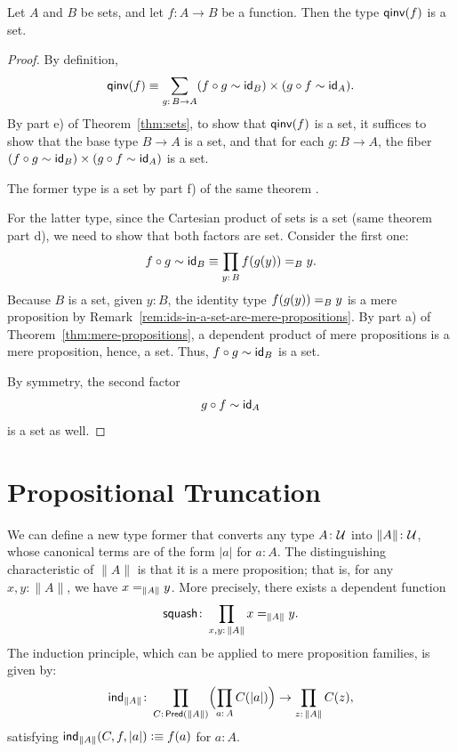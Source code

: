 \begin{prop}\fe\label{prop:qinv-is-a-set}
    Let\/ $A$ and\/ $B$ be sets, and let\/ $f\colon A\to B$ be a function. Then the type\/ $\mathsf{qinv}(f)$ is a set.
\end{prop}

\begin{proof}
    By definition,
    \[
        \fun{qinv}(f) \equiv \sum_{g\colon B\to A} (f\circ g \sim \id_B) \times (g\circ f \sim \id_A).
    \]
    By part e) of Theorem~\ref{thm:sets}, to show that $\mathsf{qinv}(f)$ is a set, it suffices to show that the base type $B\to A$ is a set, and that for each $g\colon B\to A$, the fiber $(f\circ g \sim \mathsf{id}_B) \times (g\circ f \sim \mathsf{id}_A)$ is a set.

    The former type is a set by part f) of the same theorem .
    
    For the latter type, since the Cartesian product of sets is a set (same theorem part d), we need to show that both factors are set. Consider the first one:
    \[
        f\circ g\sim\id_B
            \equiv\prod_{y\colon B}f(g(y))\eq By.
    \]
    Because $B$ is a set, given $y\colon B$, the identity type $f(g(y)) \mathrel{=_{B}} y$ is a mere proposition by Remark~\ref{rem:ids-in-a-set-are-mere-propositions}. By part a) of Theorem~\ref{thm:mere-propositions}, a dependent product of mere propositions is a mere proposition, hence, a set. Thus, $f\circ g \sim \mathsf{id}_B$ is a set.

    By symmetry, the second factor
    \[
        g\circ f \sim \mathsf{id}_A
    \]
    is a set as well.
\end{proof}


\section{Propositional Truncation}\label{propositional-truncation}
We can define a new type former that converts any type $A\colon\univ$ into $\lVert A\rVert\colon\univ$, whose canonical terms are of the form $\lvert a\rvert$ for $a\colon A$. The distinguishing characteristic of $\lVert A\rVert$ is that it is a mere proposition; that is, for any $x,y\colon\lVert A\rVert$, we have $x\mathrel{=_{\lVert A\rVert}}y$. More precisely, there exists a dependent function
\[
    \fun{squash}\colon\prod_{x,y\colon\lVert A\rVert}x\eq{\lVert A\rVert}y.
\]
The induction principle, which can be applied to mere proposition families, is given by:
\begin{equation}\label{eq:ind-truncation}
    \fun{ind}_{\lVert A\rVert}\colon
        \prod_{C\colon\fun{Pred}(\lVert A\rVert)}
        \Bigl(\prod_{a\colon A} C(\lvert a\rvert)\Bigr)
        \to
        \prod_{z\colon\lVert A\rVert} C(z),
\end{equation}
satisfying $\mathsf{ind}_{\lVert A\rVert}(C,f,\lvert a\rvert)\mathrel{\vcentcolon}\equiv f(a)$ for $a\colon A$.

